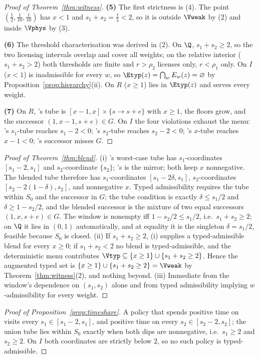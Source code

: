 \begin{proof}[Proof of Theorem~\ref{thm:witness}]
\textbf{(5)} The first strictness is (4). The point $(\tfrac12,\tfrac1{10},\tfrac1{10})$ has $x<1$ and $s_1+s_2=\tfrac15<2$, so it is outside $\Vweak$ by (2) and inside $\Vphys$ by (3).

\textbf{(6)} The threshold characterisation was derived in (2). On $\Q$, $s_1+s_2\ge2$, so the two licensing intervals overlap and cover all weights; on the relative interior ($s_1+s_2>2$) both thresholds are finite and $r>\rho_2$ licenses  only, $r<\rho_1$  only. On $I$ ($x<1$)  is inadmissible for every $w$, so $\Etyp(z)=\bigcap_wE_w(z)=\varnothing$ by Proposition~\ref{prop:hierarchy}(ii). On $R$ ($x\ge1$)  lies in $\Etyp(z)$ and serves every weight.

\textbf{(7)} On $R$, 's tube is $[x-1,x]\times\{s\to s+e\}$ with $x\ge1$, the floors grow, and the successor $(1,x-1,s+e)\in G$. On $I$ the four violations exhaust the menu: 's $s_1$-tube reaches $s_1-2<0$; 's $s_2$-tube reaches $s_2-2<0$; 's $x$-tube reaches $x-1<0$; 's successor misses $G$.
\end{proof}

\begin{proof}[Proof of Theorem~\ref{thm:blend}]
(i) 's worst-case tube has $s_1$-coordinates $[s_1-2,s_1]$ and $s_2$-coordinate $\{s_2\}$; 's is the mirror; both keep $x$ nonnegative. The blended tube therefore has $s_1$-coordinates $[s_1-2\delta,s_1]$, $s_2$-coordinates $[s_2-2(1-\delta),s_2]$, and nonnegative $x$. Typed admissibility requires the tube within $S_0$ and the successor in $G$; the tube condition is exactly $\delta\le s_1/2$ and $\delta\ge1-s_2/2$, and the blended successor is the mixture of two equal successors $(1,x,s+e)\in G$. The window is nonempty iff $1-s_2/2\le s_1/2$, i.e.\ $s_1+s_2\ge2$; on $\Q$ it lies in $(0,1)$ automatically, and at equality it is the singleton $\delta=s_1/2$, feasible because $S_0$ is closed.
(ii) If $s_1+s_2\ge2$, (i) supplies a typed-admissible blend for every $x\ge0$; if $s_1+s_2<2$ no blend is typed-admissible, and the deterministic menu contributes $\Vtyp\subseteq\{x\ge1\}\cup\{s_1+s_2\ge2\}$. Hence the augmented typed set is $\{x\ge1\}\cup\{s_1+s_2\ge2\}=\Vweak$ by Theorem~\ref{thm:witness}(2), and nothing beyond.
(iii) Immediate from the window's dependence on $(s_1,s_2)$ alone and from typed admissibility implying $w$-admissibility for every weight.
\end{proof}

\begin{proof}[Proof of Proposition~\ref{prop:timeshare}]
A policy that spends positive time on  visits every $s_1\in[s_1-2,s_1]$, and positive time on  every $s_2\in[s_2-2,s_2]$; the union tube lies within $S_0$ exactly when both dips are nonnegative, i.e.\ $s_1\ge2$ and $s_2\ge2$. On $I$ both coordinates are strictly below $2$, so no such policy is typed-admissible.
\end{proof}

